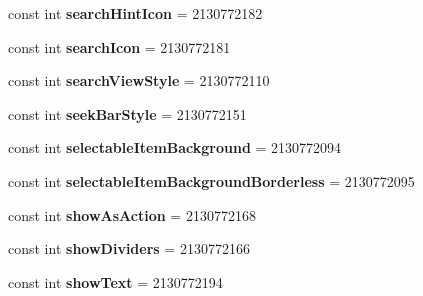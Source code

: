 \begin{DoxyCompactItemize}
const int {\bfseries search\+Hint\+Icon} = 2130772182
\item 
\mbox{\label{class_sample_app_1_1_droid_1_1_resource_1_1_attribute_aa52e66501d2f8f1f120440a228147485}} 
const int {\bfseries search\+Icon} = 2130772181
\item 
\mbox{\label{class_sample_app_1_1_droid_1_1_resource_1_1_attribute_af3d90d3aa482e3952b98c66c6a228cd8}} 
const int {\bfseries search\+View\+Style} = 2130772110
\item 
\mbox{\label{class_sample_app_1_1_droid_1_1_resource_1_1_attribute_a9a58a6ab3958198e729d660f222aea12}} 
const int {\bfseries seek\+Bar\+Style} = 2130772151
\item 
\mbox{\label{class_sample_app_1_1_droid_1_1_resource_1_1_attribute_a63d62254d802641f4d56ad7251460913}} 
const int {\bfseries selectable\+Item\+Background} = 2130772094
\item 
\mbox{\label{class_sample_app_1_1_droid_1_1_resource_1_1_attribute_afc75a834631715e53e956d7f72bd7bb7}} 
const int {\bfseries selectable\+Item\+Background\+Borderless} = 2130772095
\item 
\mbox{\label{class_sample_app_1_1_droid_1_1_resource_1_1_attribute_aba5657487f60038c0d0ff271c2a43b2b}} 
const int {\bfseries show\+As\+Action} = 2130772168
\item 
\mbox{\label{class_sample_app_1_1_droid_1_1_resource_1_1_attribute_ae8245c5e04d7e020a133b2567d9c9f50}} 
const int {\bfseries show\+Dividers} = 2130772166
\item 
\mbox{\label{class_sample_app_1_1_droid_1_1_resource_1_1_attribute_ac324847da1210b97e6ad7a83b3df3e69}} 
const int {\bfseries show\+Text} = 2130772194
\item 
\mbox{\label{class_sample_app_1_1_droid_1_1_resource_1_1_attribute_ab94974efc15bc4c5e05126ca8462b4d1}} 

\end{DoxyCompactItemize}
